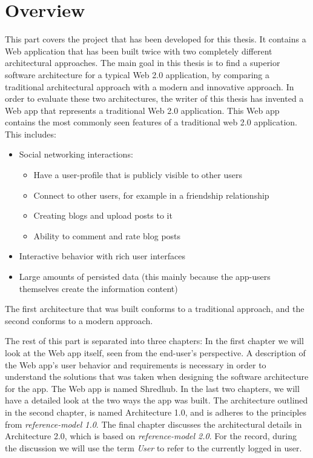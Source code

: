 \section{Overview}
This part covers the project that has been developed for this thesis. It contains a Web application that has been built twice with two completely different architectural approaches. The main goal in this thesis is to find a superior software architecture for a typical Web 2.0 application, by comparing a traditional architectural approach with a modern and innovative approach. In order to evaluate these two architectures, the writer of this thesis has invented a Web app that represents a traditional Web 2.0 application. This Web app contains the most commonly seen features of a traditional web 2.0 application. This includes:
\begin{itemize}
\item{} Social networking interactions:
	\begin{itemize}
		\item{} Have a user-profile that is publicly visible to other users
		\item{} Connect to other users, for example in a friendship relationship
		\item{} Creating blogs and upload posts to it 
		\item{} Ability to comment and rate blog posts
	\end{itemize}
\item{} Interactive behavior with rich user interfaces
\item{} Large amounts of persisted data (this mainly because the app-users themselves create the information content)
\end{itemize}

The first architecture that was built conforms to a traditional approach, and the second conforms to a modern approach. 

The rest of this part is separated into three chapters: In the first chapter we will look at the Web app itself, seen from the end-user's perspective. A description of the Web app's user behavior and requirements is necessary in order to understand the solutions that was taken when designing the software architecture for the app. The Web app is named Shredhub. In the last two chapters, we will have a detailed look at the two ways the app was built. The architecture outlined in the second chapter, is named Architecture 1.0, and is adheres to the principles from \textit{reference-model 1.0}. The final chapter discusses the architectural details in Architecture 2.0, which is based on \textit{reference-model 2.0}. For the record, during the discussion we will use the term \textit{User} to refer to the currently logged in user.
